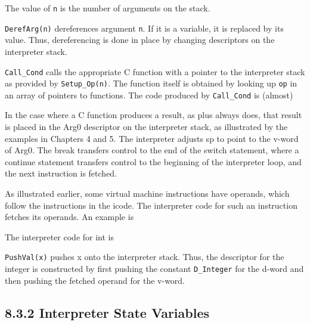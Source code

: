 
The value of \texttt{n} is the number of arguments on the stack.

\texttt{DerefArg(n)} dereferences argument \texttt{n}. If it is a
variable, it is replaced by its value. Thus, dereferencing is done in
place by changing descriptors on the interpreter stack.

\texttt{Call\_Cond} calls the appropriate C function with a pointer to
the interpreter stack as provided by \texttt{Setup\_Op(n)}. The
function itself is obtained by looking up \texttt{op} in an array of
pointers to functions.  The code produced by \texttt{Call\_Cond} is
(almost)

\goodbreak
\iconcode{
\>(*(optab(op]) )(rargp);\\
\>sp = (word * )rargp + 1:
}

In the case where a C function produces a result, as plus always does,
that result is placed in the Arg0 descriptor on the interpreter stack,
as illustrated by the examples in Chapters 4 and 5. The interpreter
adjusts sp to point to the v-word of Arg0. The break transfers control
to the end of the switch statement, where a continue statement
transfers control to the beginning of the interpreter loop, and the
next instruction is fetched.

As illustrated earlier, some virtual machine instructions have
operands, which follow the instructions in the icode. The interpreter
code for such an instruction fetches its operands. An example is


The interpreter code for int is

\goodbreak
{}

\texttt{PushVal(x)} pushes x onto the interpreter stack. Thus, the descriptor
for the integer is constructed by first pushing the constant \texttt{D\_Integer}
for the d-word and then pushing the fetched operand for the v-word.

\subsection[8.3.2 Interpreter State Variables]{8.3.2 Interpreter State Variables}

